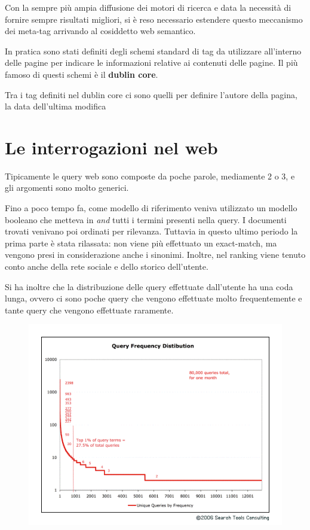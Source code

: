 Con la sempre più ampia diffusione dei motori di ricerca e data la necessità di fornire sempre risultati migliori, si è reso necessario estendere questo meccanismo dei meta-tag arrivando al cosiddetto web semantico.

In pratica sono stati definiti degli schemi standard di tag da utilizzare all'interno delle pagine per indicare le informazioni relative ai contenuti delle pagine.
Il più famoso di questi schemi è il \textbf{dublin core}.

Tra i tag definiti nel dublin core ci sono quelli per definire l'autore della pagina, la data dell'ultima modifica 

\section{Le interrogazioni nel web}

Tipicamente le query web sono composte da poche parole, mediamente 2 o 3, e gli argomenti sono molto generici.

Fino a poco tempo fa, come modello di riferimento veniva utilizzato un modello booleano che metteva in \textit{and} tutti i termini presenti nella query. I documenti trovati venivano poi ordinati per rilevanza.
Tuttavia in questo ultimo periodo la prima parte è stata rilassata: non viene più effettuato un exact-match, ma vengono presi in considerazione anche i sinonimi. Inoltre, nel ranking viene tenuto conto anche della rete sociale e dello storico dell'utente.

Si ha inoltre che la distribuzione delle query effettuate dall'utente ha una coda lunga, ovvero ci sono poche query che vengono effettuate molto frequentemente e tante query che vengono effettuate raramente.

\begin{figure}[htbp]
	\centering
	\includegraphics[width=.6\textwidth]{images/l18-fig-1.png}
\end{figure}

